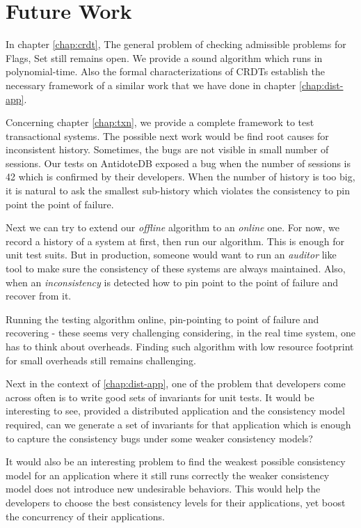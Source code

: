 \section{Future Work}
\label{sec:global-future-work}

In chapter \ref{chap:crdt}, The general problem of checking admissible problems for Flags, Set still remains open. We provide a sound algorithm which runs in polynomial-time. Also the formal characterizations of CRDTs establish the necessary framework of a similar work that we have done in chapter \ref{chap:dist-app}.

Concerning chapter \ref{chap:txn}, we provide a complete framework to test transactional systems. The possible next work would be find root causes for inconsistent history. Sometimes, the bugs are not visible in small number of sessions. Our tests on AntidoteDB exposed a bug when the number of sessions is 42 which is confirmed by their developers. When the number of history is too big, it is natural to ask the smallest sub-history which violates the consistency to pin point the point of failure.

Next we can try to extend our \emph{offline} algorithm to an \emph{online} one. For now, we record a history of a system at first, then run our algorithm. This is enough for unit test suits. But in production, someone would want to run an \emph{auditor} like tool to make sure the consistency of these systems are always maintained. Also, when an \emph{inconsistency} is detected how to pin point to the point of failure and recover from it.

Running the testing algorithm online, pin-pointing to point of failure and recovering - these seems very challenging considering, in the real time system, one has to think about overheads. Finding such algorithm with low resource footprint for small overheads still remains challenging.

Next in the context of \ref{chap:dist-app}, one of the problem that developers come across often is to write good sets of invariants for unit tests. It would be interesting to see, provided a distributed application and the consistency model required, can we generate a set of invariants for that application which is enough to capture the consistency bugs under some weaker consistency models?

It would also be an interesting problem to find the weakest possible consistency model for an application where it still runs correctly \ie the weaker consistency model does not introduce new undesirable behaviors. This would help the developers to choose the best consistency levels for their applications, yet boost the concurrency of their applications.

